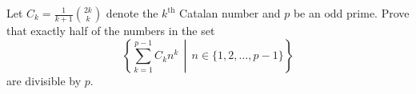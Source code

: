 Let $C_k=\frac{1}{k+1}\binom{2k}{k}$ denote the $k^{\text{th}}$ Catalan number and $p$ be an odd prime. Prove that exactly half of the numbers in the set
\[\left\{\sum_{k=1}^{p-1}C_kn^k\,\middle\vert\, n\in\{1,2,\ldots,p-1\}\right\}\]
are divisible by $p$.